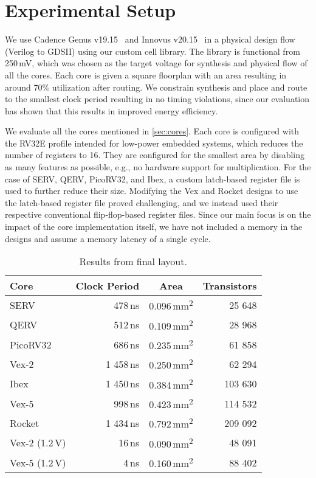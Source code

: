 \section{Experimental Setup}
\label{sec:experimental-setup}

We use Cadence Genus v19.15~\cite{genus} and Innovus v20.15~\cite{innovus} in a physical design flow (Verilog to GDSII) using our custom cell library.
The library is functional from 250\,mV, which was chosen as the target voltage for synthesis and physical flow of all the cores.  Each core is given a square floorplan with an area resulting
in around 70\% utilization after routing.  We constrain synthesis and place and route to the smallest clock period resulting in no timing violations, since our evaluation has shown that this results in improved energy efficiency.

We evaluate all the cores mentioned in \autoref{sec:cores}.  
Each core is configured with the RV32E profile intended for low-power embedded systems, which reduces the number of registers to 16.
They are configured for the smallest area by disabling as many features as possible, e.g., no hardware support for multiplication.
For the case of SERV, QERV, PicoRV32, and Ibex, a custom latch-based register file is used to further reduce their size.
Modifying the Vex and Rocket designs to use the latch-based register file proved challenging, and we instead used their respective conventional flip-flop-based register files.
Since our main focus is on the impact of the core implementation itself, we have not included a memory in the designs and assume a memory latency of a single cycle.

\begin{table}[t]
  \centering
  \caption{Results from final layout.}
  \label{tab:PRcores}
  \begin{tabular}{l|r|c|r}
    Core     & Clock Period  & Area                       & Transistors \\
    \hline \hline
    SERV     &   478\,ns     & 0.096\,mm\textsuperscript{2} &  25 648 \\
    QERV     &   512\,ns     & 0.109\,mm\textsuperscript{2} &  28 968 \\
    PicoRV32 &   686\,ns     & 0.235\,mm\textsuperscript{2} &  61 858 \\
    Vex-2    & 1 458\,ns     & 0.250\,mm\textsuperscript{2} &  62 294 \\
    Ibex     & 1 450\,ns     & 0.384\,mm\textsuperscript{2} & 103 630 \\
    Vex-5    &   998\,ns     & 0.423\,mm\textsuperscript{2} & 114 532 \\
    Rocket   & 1 434\,ns     & 0.792\,mm\textsuperscript{2} & 209 092 \\
    \hline
    Vex-2 (1.2\,V)  & 16\,ns & 0.090\,mm\textsuperscript{2} &  48 091 \\
    Vex-5 (1.2\,V) &  4\,ns & 0.160\,mm\textsuperscript{2} &  88 402 \\
  \end{tabular}
\end{table}


